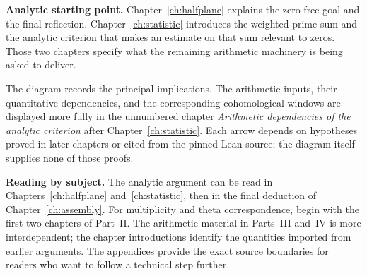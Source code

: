 \documentclass[11pt,openany,oneside]{scrbook}
\theoremstyle{definition}
\theoremstyle{remark}
\begin{document}
\medskip
\begin{center}
\end{center}

\noindent\textbf{Analytic starting point.} Chapter~\ref{ch:halfplane} explains the zero-free goal and the final reflection. Chapter~\ref{ch:statistic} introduces the weighted prime sum and the analytic criterion that makes an estimate on that sum relevant to zeros. Those two chapters specify what the remaining arithmetic machinery is being asked to deliver.

\medskip
\noindent The diagram records the principal implications. The arithmetic inputs, their quantitative dependencies, and the corresponding cohomological windows are displayed more fully in the unnumbered chapter \emph{Arithmetic dependencies of the analytic criterion} after Chapter~\ref{ch:statistic}. Each arrow depends on hypotheses proved in later chapters or cited from the pinned Lean source; the diagram itself supplies none of those proofs.

\medskip
\noindent\textbf{Reading by subject.} The analytic argument can be read in Chapters~\ref{ch:halfplane} and~\ref{ch:statistic}, then in the final deduction of Chapter~\ref{ch:assembly}. For multiplicity and theta correspondence, begin with the first two chapters of Part~II. The arithmetic material in Parts~III and~IV is more interdependent; the chapter introductions identify the quantities imported from earlier arguments. The appendices provide the exact source boundaries for readers who want to follow a technical step further.
\end{document}
